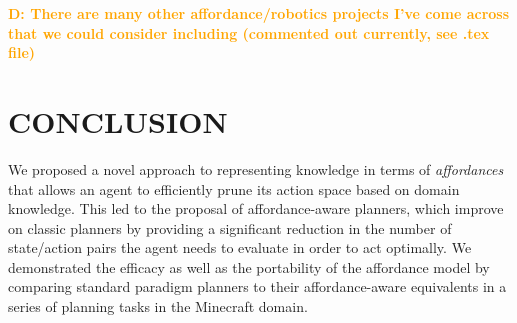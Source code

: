 \documentclass[]{article}
\newcommand{\dnote}[1]{\textcolor{Orange}{\textbf{D: #1}}}
\begin{document}
\dnote{There are many other affordance/robotics projects I've come across that we could consider including (commented out currently, see .tex file)}


\section{CONCLUSION}

We proposed a novel approach to representing knowledge in terms of
{\em affordances}~\citep{gibson77} that allows an agent to efficiently
prune its action space based on domain knowledge. This led to the 
proposal of affordance-aware planners, which improve on classic planners
by providing a significant reduction in the number of state/action pairs the
agent needs to evaluate in order to act optimally. We demonstrated the efficacy 
as well as the portability of the affordance model by comparing standard paradigm
planners to their affordance-aware equivalents in a series of planning tasks in the Minecraft
domain.
\end{document}
